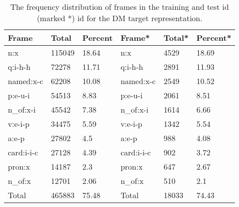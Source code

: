 \begin{table}
    \centering
    \smaller[0.4]
    \begin{tabular}{@{}llllll@{}}
        \toprule
        \textbf{Frame} & \textbf{Total} & \textbf{Percent} & \textbf{Frame*} & \textbf{Total*} & \textbf{Percent*} \\
        \midrule
        n:x & 115049 & 18.64 & n:x & 4529 & 18.69 \\
        q:i-h-h & 72278 & 11.71 & q:i-h-h & 2891 & 11.93 \\
        named:x-c & 62208 & 10.08 & named:x-c & 2549 & 10.52 \\
        p:e-u-i & 54513 & 8.83 & p:e-u-i & 2061 & 8.51 \\
        n\_of:x-i & 45542 & 7.38 & n\_of:x-i & 1614 & 6.66 \\
        v:e-i-p & 34475 & 5.59 & v:e-i-p & 1342 & 5.54 \\
        a:e-p & 27802 & 4.5 & a:e-p & 988 & 4.08 \\
        card:i-i-c & 27128 & 4.39 & card:i-i-c & 902 & 3.72 \\
        pron:x & 14187 & 2.3 & pron:x & 647 & 2.67 \\
        n\_of:x & 12701 & 2.06 & n\_of:x & 510 & 2.1 \\
        \midrule
        Total & 465883 & 75.48  & Total & 18033 & 74.43 \\
        \bottomrule
    \end{tabular}
    \caption{The frequency distribution of frames in the training and test id (marked *) id for the DM target representation.}
    \label{table:dm_frames_freq}
\end{table}


